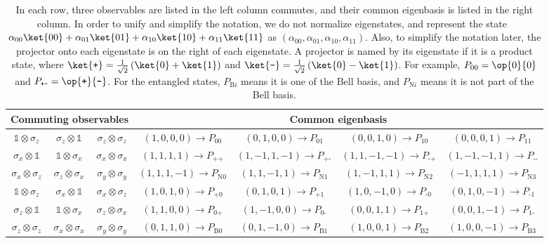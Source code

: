 \documentclass[english,reprint, aps, prl,superscriptaddress, showpacs,
showkeys, longbibliography, amsmath, amssymb]{revtex4-1}
\theoremstyle{plain}
\theoremstyle{definition}
\newcommand{\ps}{\texttt{+}}
\newcommand{\ms}{\texttt{-}}
\begin{document}
\begin{table*}
\caption{\label{table:commonBasis}In each row, three observables are listed
in the left column commutes, and their common eigenbasis is listed
in the right column. In order to unify and simplify the notation,
we do not normalize eigenstates, and represent the state~$\alpha_{00}\ket{00}+\alpha_{01}\ket{01}+\alpha_{10}\ket{10}+\alpha_{11}\ket{11}$
as $\left(\alpha_{00},\alpha_{01},\alpha_{10},\alpha_{11}\right)$.
Also, to simplify the notation later, the projector onto each eigenstate
is on the right of each eigenstate. A projector is named by its eigenstate
if it is a product state, where $\ket{\ps}=\frac{1}{\sqrt{2}}\left(\ket{0}+\ket{1}\right)$
and $\ket{\ms}=\frac{1}{\sqrt{2}}\left(\ket{0}-\ket{1}\right)$. For
example, $P_{00}=\op{0}{0}$ and $P_{\ps\ms}=\op{\ps}{\ms}$. For
the entangled states, $P_{\textrm{B}i}$ means it is one of the Bell
basis, and $P_{\textrm{N}i}$ means it is not part of the Bell basis.}

\begin{ruledtabular}
\begin{tabular}{ccc|cccc}
\multicolumn{3}{c}{Commuting observables} & \multicolumn{4}{c}{Common eigenbasis}\tabularnewline
\hline 
$\mathbb{1}\otimes\sigma_{z}$  & $\sigma_{z}\otimes\mathbb{1}$  & $\sigma_{z}\otimes\sigma_{z}$  & $(1,0,0,0)\rightarrow P_{00}$  & $(0,1,0,0)\rightarrow P_{01}$  & $(0,0,1,0)\rightarrow P_{10}$  & $(0,0,0,1)\rightarrow P_{11}$ \tabularnewline
$\sigma_{x}\otimes\mathbb{1}$  & $\mathbb{1}\otimes\sigma_{x}$  & $\sigma_{x}\otimes\sigma_{x}$  & $(1,1,1,1)\rightarrow P_{\ps\ps}$  & $(1,-1,1,-1)\rightarrow P_{\ps\ms}$  & $(1,1,-1,-1)\rightarrow P_{\ms\ps}$  & $(1,-1,-1,1)\rightarrow P_{\ms\ms}$ \tabularnewline
$\sigma_{x}\otimes\sigma_{z}$  & $\sigma_{z}\otimes\sigma_{x}$  & $\sigma_{y}\otimes\sigma_{y}$  & $(1,1,1,-1)\rightarrow P_{\textrm{N}0}$  & $(1,1,-1,1)\rightarrow P_{\textrm{N}1}$  & $(1,-1,1,1)\rightarrow P_{\textrm{N}2}$  & $(-1,1,1,1)\rightarrow P_{\textrm{N}3}$ \tabularnewline
$\mathbb{1}\otimes\sigma_{z}$  & $\sigma_{x}\otimes\mathbb{1}$  & $\sigma_{x}\otimes\sigma_{z}$  & $(1,0,1,0)\rightarrow P_{\ps0}$  & $(0,1,0,1)\rightarrow P_{\ps1}$  & $(1,0,-1,0)\rightarrow P_{\ms0}$  & $(0,1,0,-1)\rightarrow P_{\ms1}$ \tabularnewline
$\sigma_{z}\otimes\mathbb{1}$  & $\mathbb{1}\otimes\sigma_{x}$  & $\sigma_{z}\otimes\sigma_{x}$  & $(1,1,0,0)\rightarrow P_{0\ps}$  & $(1,-1,0,0)\rightarrow P_{0\ms}$  & $(0,0,1,1)\rightarrow P_{1\ps}$  & $(0,0,1,-1)\rightarrow P_{1\ms}$ \tabularnewline
$\sigma_{z}\otimes\sigma_{z}$  & $\sigma_{x}\otimes\sigma_{x}$  & $\sigma_{y}\otimes\sigma_{y}$  & $(0,1,1,0)\rightarrow P_{\textrm{B}0}$  & $(0,1,-1,0)\rightarrow P_{\textrm{B}1}$  & $(1,0,0,1)\rightarrow P_{\textrm{B}2}$  & $(1,0,0,-1)\rightarrow P_{\textrm{B}3}$ \tabularnewline
\end{tabular}
\end{ruledtabular}

\end{table*}
\end{document}
